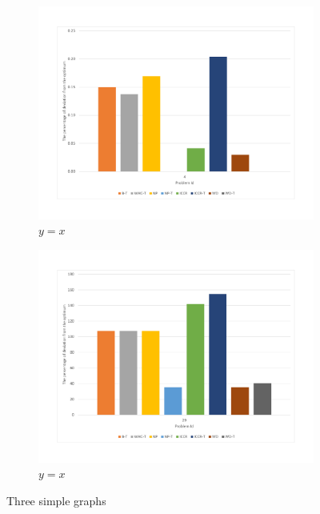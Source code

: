 \begin{figure}
	\centering
	\begin{subfigure}{0.45\textwidth}
		\includegraphics[width=\textwidth]{images/EnergyDeviationSmallProblem.pdf}
		\caption{$y=x$}
		\label{fig:SmallProblemEnergy}
	\end{subfigure}
	\hfill
	\begin{subfigure}{0.45\textwidth}
		\includegraphics[width=\textwidth]{images/EnergyDeviationMediumProblem.pdf}
		\caption{$y=x$}
		\label{fig:MediumProblemEnergy}
	\end{subfigure}	
	\caption{Three simple graphs}
	\label{fig:SmallMediumProblemEnergy}	
\end{figure}


